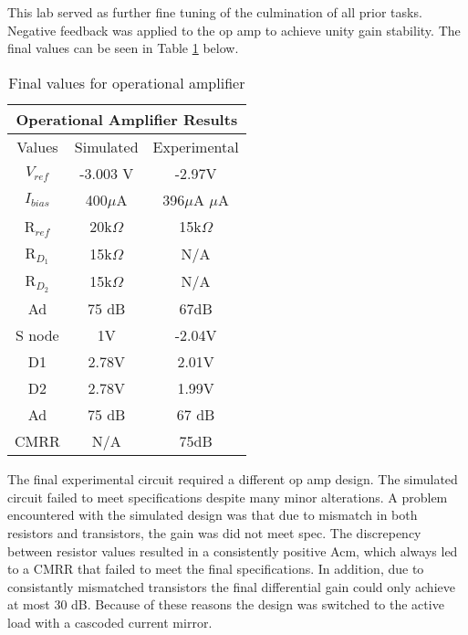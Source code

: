 

This lab served as further fine tuning of the culmination of all prior tasks. Negative feedback was applied to the op amp to achieve unity gain stability. The final values can be seen in Table \ref{tab:FinalRes} below. 

\begin{table}[H]
\centering
\caption{Final values for operational amplifier}
\label{tab:FinalRes}
\begin{tabular}{|c|c|c|}
\hline
\multicolumn{3}{|c|}{Operational Amplifier Results} \\ \hline
Values          & Simulated          & Experimental          \\ \hline
$V_{ref}$               & -3.003 V                   & -2.97V                     \\ \hline
$I_{bias}$                & 400$\mu$A                   & 396$\mu$A $\mu$A                      \\ \hline
R$_{ref}$                 & 20k$\Omega$               & 15k$\Omega$                \\ \hline
R$_{D_1}$                 & 15k$\Omega$                   & N/A                  \\ \hline
R$_{D_2}$                 & 15k$\Omega$                   &  N/A                     \\ \hline
Ad                       & 75 dB             &  67dB  \\ \hline
S node                    & 1V                          & -2.04V \\ \hline
D1                          & 2.78V                     & 2.01V   \\ \hline
D2                         & 2.78V                      & 1.99V  \\ \hline
Ad                         & 75 dB                      & 67 dB \\ \hline
CMRR                   & N/A                          & 75dB \\ \hline
\end{tabular}
\end{table}
The final experimental circuit required a different op amp design. The simulated circuit failed to meet specifications despite many minor alterations. A problem encountered with the simulated design was that due to mismatch in both resistors and transistors, the gain was did not meet spec. The discrepency between resistor values resulted in a consistently positive Acm, which always led to a CMRR that failed to meet the final specifications. In addition, due to consistantly mismatched transistors the final differential gain could only achieve at most 30 dB. Because of these reasons the design was switched to the active load with a cascoded current mirror.

